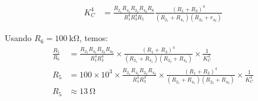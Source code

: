 \documentclass[a4paper]{article}
\begin{document}
\begin{align}
K_C^4 &= \frac{R_{2_1}R_{4_1}R_{2_2}R_{4_2}R_6}{R_1^4R_3^4R_5} \frac{(R_1+R_3)^4}{(R_{2_1}+R_{4_1})(R_{2_2}+r_{4_2})}
\end{align}
\par Usando $R_6=\SI{100}{\kilo\ohm}$, temos:
\begin{align}
\frac{R_5}{R_6} &= \frac{R_{2_1}R_{4_1}R_{2_2}R_{4_2}}{R_1^4R_3^4}\times \frac{(R_1+R_3)^4}{(R_{2_1}+R_{4_1})(R_{2_2}+R_{4_2})}\times\frac{1}{K_C^4}\\
R_5 &= 100\times10^3\times\frac{R_{2_1}R_{4_1}R_{2_2}R_{4_2}}{R_1^4R_3^4}\times \frac{(R_1+R_3)^4}{(R_{2_1}+R_{4_1})(R_{2_2}+R_{4_2})}\times\frac{1}{K_C^4}\\
R_5 &\approx \SI{13}{\ohm}
\end{align}
\vspace{1em}
\end{document}
